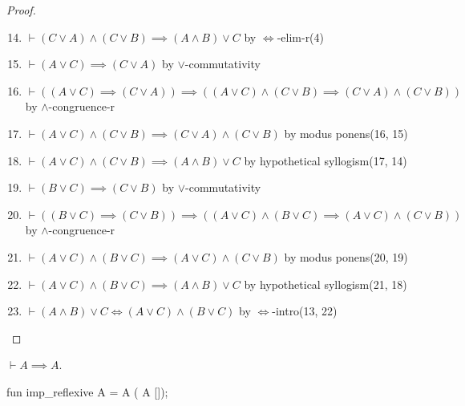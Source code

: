 \begin{proof}
\begin{enumerate}\setcounter{enumi}{13}
\item $\vdash(C\lor A)\land(C\lor B)\implies(A\land B)\lor C$ by $\Leftrightarrow$-elim-r(4)%
\item $\vdash(A\lor C)\implies(C\lor A)$ by $\lor$-commutativity%
\item $\vdash((A\lor C)\implies(C\lor A))\implies((A\lor C)\land(C\lor B)\implies(C\lor A)\land(C\lor B))$
  by $\land$-congruence-r%
\item $\vdash(A\lor C)\land(C\lor B)\implies(C\lor A)\land(C\lor B)$
  by modus ponens(16, 15)%
\item $\vdash(A\lor C)\land(C\lor B)\implies(A\land B)\lor C$ by
  hypothetical syllogism(17, 14)%
\item $\vdash(B\lor C)\implies(C\lor B)$ by $\lor$-commutativity%
\item $\vdash((B\lor C)\implies(C\lor B))\implies((A\lor C)\land(B\lor
  C)\implies(A\lor C)\land(C\lor B))$
  by $\land$-congruence-r%
\item $\vdash (A\lor C)\land(B\lor C)\implies(A\lor C)\land(C\lor B)$
  by modus ponens(20, 19)%
\item $\vdash(A\lor C)\land(B\lor C)\implies(A\land B)\lor C$ by
  hypothetical syllogism(21, 18)%
\item $\vdash(A\land B)\lor C\iff(A\lor C)\land(B\lor C)$ by
  $\Leftrightarrow$-intro(13, 22)\qedhere
\end{enumerate}
\end{proof}

\begin{node}
$\vdash A\implies A$.
\end{node}

\nwenddocs{}\endmoddef\nwstartdeflinemarkup{}\nwenddeflinemarkup
fun imp_reflexive A =
   A ( A []);
\nwendcode{}\nwdocspar

